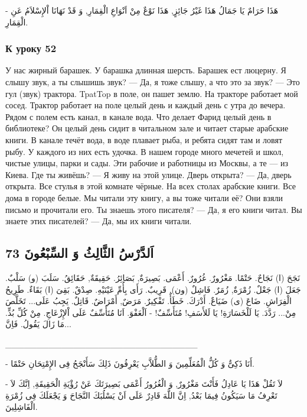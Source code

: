 \documentclass[a5paper]{article}
\begin{document}
- هَذَا حَرَامٌ يَا جَمَالُ هَذَا غَيْرُ جَائِزٍ, هَذَا نَوْعٌ مِنْ اَنْوَاعِ الْقِمَارِ, وَ قَدْ نَهَانَا اْلإِسْلاَمُ عَنِ الْقِمَارِ.

\subsubsection{К уроку 52}
У нас жирный барашек. У барашка длинная шерсть. Барашек ест люцерну. Я слышу звук, а ты слышишь звук? — Да, я тоже слышу, а что это за звук? — Это гул (звук) трактора. TpatTop в поле, он пашет землю. На тракторе работает мой сосед. Трактор работает на поле целый день и каждый день с утра до вечера. Рядом с полем есть канал, в канале вода. Что делает Фарид целый день в библиотеке? Он целый день сидит в читальном зале и читает старые арабские книги. В канале течёт вода, в воде плавает рыба, и ребята сидят там и ловят рыбу. У каждого из них есть удочка. В нашем городе много мечетей и школ, чистые улицы, парки и сады. Эти рабочие и работницы из Москвы, а те — из Киева. Где ты живёшь? — Я живу на этой улице. Дверь открыта? — Да, дверь открыта. Все стулья в этой комнате чёрные. На всех столах арабские книги. Все дома в городе белые. Мы читали эту книгу, а вы тоже читали её? Они взяли письмо и прочитали его. Ты знаешь этого писателя? — Да, я его книги читал. Вы знаете этих писателей? — Да, мы их книги читали.

\subsection{اَلدَّرْسُ الثَّالِثُ وَ السِّبْعُونَ 73}
نَجَحَ (ا) نَجَاحٌ. حَتْمًا. مَغْرُورٌ. غُرُورٌ. أَعْمَى. بَصِيرَةٌ, بَصَائِرُ. حَقِيقَةٌ, حَقَائِقُ. سَلَبَ (و) سَلْبٌ. \newline
جَعَلَ (ا) جَعْلٌ. زُمْرَةٌ, زُمَرٌ. فَاشِلٌ (ون). قَرِيبٌ. رَأَى بِأُمِّ عَيْنَيْهِ. صِدْقٌ. بَقِىَ (ا) بَقَاءٌ. طَرِيحُ الْفِرَاشِ. \newline
ضَاعَ (ى) ضَيَاعٌ. أَدْرَكَ. خَطَأٌ. تَفْكِيرٌ. مَرَضٌ, أَمْرَاضٌ. قَاتِلٌ. يَجِبُ عَلَى... تَخَلَّصَ مِنْ... رَدَّدَ. يَا لَلْخَسَارَةِ! يَا لَلأَسَفِ! مُتَأَسِّفٌ! - اَلْعَفْوَ. اَنَا مُتَأَسِّفٌ عَلَى اْلإِزْعَاجِ. مِنْ كُلِّ بُدٍّ. مَا زَالَ يَقُولُ. فَاِنَّ...

\_\_\_\_\_\_\_\_\_\_\_\_\_\_\_\_\_\_\_\_\_\_\_\_\_\_\_\_\_\_\_

- أَنَا ذَكِىٌّ وَ كُلُّ الْمُعَلِّمِينَ وَ الطُّلاَّبِ يَعْرِفُونَ ذَلِكَ سَأَنْجَحُ فِى الإِمْتِحَانِ حَتْمًا.

- لاَ تَقُلْ هَذَا يَا عَادِلُ فَأَنْتَ مَغْرُورٌ, وَ الْغُرُورُ أَعْمَى بَصِيرَتَكَ عَنْ رُؤْيَةِ الْحَقِيقَةِ, اِنَّكَ لاَ تَعْرِفُ مَا سَيَكُونُ فِيمَا بَعْدُ, اِنَّ اللَّهَ قَادِرٌ عَلَى اَنْ يَسْلُبَكَ النَّجَاحَ وَ يَجْعَلَكَ فِى زُمْرَةِ الْفَاشِلِينَ.
\end{document}
